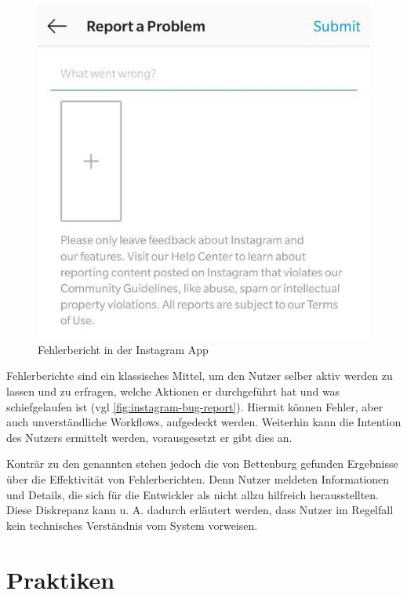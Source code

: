 \begin{figure}
\centering
\vspace{-\baselineskip}
\includegraphics[width=\linewidth]{img/instagram-feedback/instagram-feedback.jpg}
\caption{Fehlerbericht in der Instagram App \cite{Instagram}}
\label{fig:instagram-bug-report}
\end{figure}

Fehlerberichte sind ein klassisches Mittel, um den Nutzer selber aktiv werden zu lassen und zu erfragen, welche Aktionen er durchgeführt hat und was schiefgelaufen ist (vgl \autoref{fig:instagram-bug-report}). Hiermit können Fehler, aber auch unverständliche Workflows, aufgedeckt werden. Weiterhin kann die Intention des Nutzers ermittelt werden, vorausgesetzt er gibt dies an.

Konträr zu den genannten  stehen jedoch die von Bettenburg \etal \cite{WhatMakesAGoodBugReport} gefunden Ergebnisse über die Effektivität von Fehlerberichten. Denn Nutzer meldeten Informationen und Details, die sich für die Entwickler als nicht allzu hilfreich herausstellten. Diese Diskrepanz kann u. A. dadurch erläutert werden, dass Nutzer im Regelfall kein technisches Verständnis vom System vorweisen.

\section{Praktiken}

